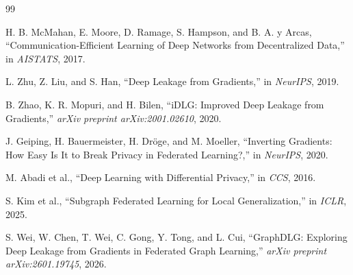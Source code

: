 \documentclass[10pt,twocolumn]{article}
\begin{document}
\begin{thebibliography}{99}

H. B. McMahan, E. Moore, D. Ramage, S. Hampson, and B. A. y Arcas, ``Communication-Efficient Learning of Deep Networks from Decentralized Data,'' in \textit{AISTATS}, 2017.

L. Zhu, Z. Liu, and S. Han, ``Deep Leakage from Gradients,'' in \textit{NeurIPS}, 2019.

B. Zhao, K. R. Mopuri, and H. Bilen, ``iDLG: Improved Deep Leakage from Gradients,'' \textit{arXiv preprint arXiv:2001.02610}, 2020.

J. Geiping, H. Bauermeister, H. Dr\"oge, and M. Moeller, ``Inverting Gradients: How Easy Is It to Break Privacy in Federated Learning?,'' in \textit{NeurIPS}, 2020.

M. Abadi et al., ``Deep Learning with Differential Privacy,'' in \textit{CCS}, 2016.

S. Kim et al., ``Subgraph Federated Learning for Local Generalization,'' in \textit{ICLR}, 2025.

S. Wei, W. Chen, T. Wei, C. Gong, Y. Tong, and L. Cui, ``GraphDLG: Exploring Deep Leakage from Gradients in Federated Graph Learning,'' \textit{arXiv preprint arXiv:2601.19745}, 2026.

\end{thebibliography}
\end{document}
